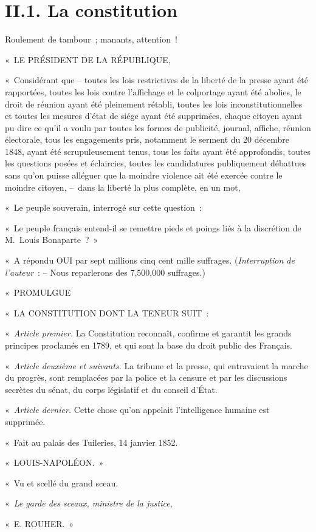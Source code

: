\documentclass[french,twoside]{book} %
\newenvironment{quoteblock}%
  {\begin{quoting}}
  {\end{quoting}}
\newcommand\chaptercont{} %
\newenvironment{quotebar}{%
    \def\FrameCommand{{\color{rubric!10!}\vrule width 0.5em} \hspace{0.9em}}%
    \def\OuterFrameSep{0pt} %
    \MakeFramed {\advance\hsize-\width \FrameRestore}
  }%
  {%
    \endMakeFramed
  }
\renewenvironment{quoteblock}%
  {%
    \savenotes
    \setstretch{0.9}
    \begin{quotebar}
    \smallskip
  }
  {%
    \smallskip
    \end{quotebar}
    \spewnotes
  }
\begin{document}
\chaptercont

\section[{II.1. La constitution}]{II.1. La constitution}

Roulement de tambour ; manants, attention !\par

\begin{quoteblock}
 \noindent « LE PRÉSIDENT DE LA RÉPUBLIQUE,\par
 « Considérant que – toutes les lois restrictives de la liberté de la presse ayant été rapportées, toutes les lois contre l’affichage et le colportage ayant été abolies, le droit de réunion ayant été pleinement rétabli, toutes les lois inconstitutionnelles et toutes les mesures d’état de siége ayant été supprimées, chaque citoyen ayant pu dire ce qu’il a voulu par toutes les formes de publicité, journal, affiche, réunion électorale, tous les engagements pris, notamment le serment du 20 décembre 1848, ayant été scrupuleusement tenus, tous les faits ayant été approfondis, toutes les questions posées et éclaircies, toutes les candidatures publiquement débattues sans qu’on puisse alléguer que la moindre violence ait été exercée contre le moindre citoyen, – dans la liberté la plus complète, en un mot,\par
 « Le peuple souverain, interrogé sur cette question :\par
 « Le peuple français entend-il se remettre pieds et poings liés à la discrétion de M. Louis Bonaparte ? »\par
 « A répondu OUI par sept millions cinq cent mille suffrages. (\emph{Interruption de l’auteur} : – Nous reparlerons des 7,500,000 suffrages.)\par
 « PROMULGUE\par
 « LA CONSTITUTION DONT LA TENEUR SUIT :\par
 « \emph{Article premier.} La Constitution reconnaît, confirme et garantit les grands principes proclamés en 1789, et qui sont la base du droit public des Français.\par
 « \emph{Article deuxième et suivants.} La tribune et la presse, qui entravaient la marche du progrès, sont remplacées par la police et la censure et par les discussions secrètes du sénat, du corps législatif et du conseil d’État.\par
 « \emph{Article dernier.} Cette chose qu’on appelait l’intelligence humaine est supprimée.\par
 « Fait au palais des Tuileries, 14 janvier 1852.\par
 « LOUIS-NAPOLÉON. »\par
 « Vu et scellé du grand sceau.\par
 « \emph{Le garde des sceaux, ministre de la justice},\par
 « E. ROUHER. »
 \end{quoteblock}
\end{document}
